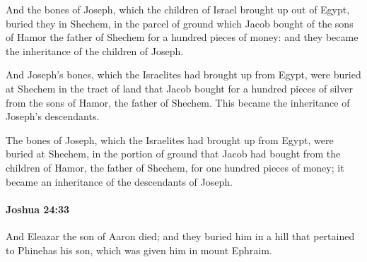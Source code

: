 			\begin{versebox}
					\item[BHS] 
					\item[ASV] And the bones of Joseph, which the children of Israel brought up out of Egypt, buried they in Shechem, in the parcel of ground which Jacob bought of the sons of Hamor the father of Shechem for a hundred pieces of money: and they became the inheritance of the children of Joseph.
					\item[NIV] And Joseph’s bones, which the Israelites had brought up from Egypt, were buried at Shechem in the tract of land that Jacob bought for a hundred pieces of silver from the sons of Hamor, the father of Shechem. This became the inheritance of Joseph’s descendants.
					\item[NRSV] The bones of Joseph, which the Israelites had brought up from Egypt, were buried at Shechem, in the portion of ground that Jacob had bought from the children of Hamor, the father of Shechem, for one hundred pieces of money; it became an inheritance of the descendants of Joseph.
			\end{versebox}

		\paragraph{Joshua 24:33} %
			\label{JOSHUA-24-33}

			And Eleazar the son of Aaron died; and they buried him in a hill that pertained to Phinehas his son, which was given him in mount Ephraim.

